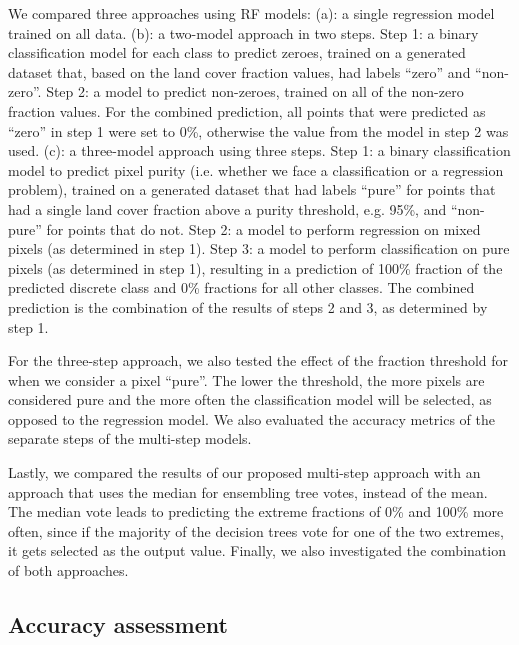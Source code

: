 \documentclass[review,authoryear,3p]{elsarticle}
\begin{document}
We compared three approaches using \gls{RF} models:
(a): a single regression model trained on all data.
(b): a two-model approach in two steps.
Step 1: a binary classification model for each class to predict zeroes, trained on a generated dataset that, based on the land cover fraction values, had labels ``zero'' and ``non-zero''.
Step 2: a model to predict non-zeroes, trained on all of the non-zero fraction values.
For the combined prediction, all points that were predicted as ``zero'' in step 1 were set to 0\%, otherwise the value from the model in step 2 was used.
(c): a three-model approach using three steps.
Step 1: a binary classification model to predict pixel purity (i.e. whether we face a classification or a regression problem), trained on a generated dataset that had labels ``pure'' for points that had a single land cover fraction above a purity threshold, e.g. 95\%, and ``non-pure'' for points that do not.
Step 2: a model to perform regression on mixed pixels (as determined in step 1).
Step 3: a model to perform classification on pure pixels (as determined in step 1), resulting in a prediction of 100\% fraction of the predicted discrete class and 0\% fractions for all other classes.
The combined prediction is the combination of the results of steps 2 and 3, as determined by step 1.

For the three-step approach, we also tested the effect of the fraction threshold for when we consider a pixel ``pure''.
The lower the threshold, the more pixels are considered pure and the more often the classification model will be selected, as opposed to the regression model.
We also evaluated the accuracy metrics of the separate steps of the multi-step models.

Lastly, we compared the results of our proposed multi-step approach with an approach that uses the median for ensembling tree votes, instead of the mean.
The median vote leads to predicting the extreme fractions of 0\% and 100\% more often, since if the majority of the decision trees vote for one of the two extremes, it gets selected as the output value.
Finally, we also investigated the combination of both approaches.

\subsection{Accuracy assessment}
\end{document}
